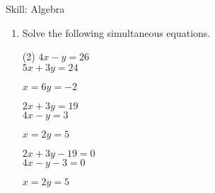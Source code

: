 \begin{bxTip}[colbacktitle=green]{Skill: Algebra}

\begin{enumerate} [leftmargin=0cm] 

\item Solve the following simultaneous equations.
\begin{tasks}[label=(\alph*), after-item-skip=2pt,after-skip=3pt, label-width=4ex](2)
    \task  $4x-y = 26$\\
           $5x + 3y = 24$	
	              \begin{envAnswer}[blankline=6]         $      x=6  y=-2        $ \end{envAnswer}


    \task  $2x + 3y = 19$\\
           $4x-y = 3$	
	              \begin{envAnswer}[blankline=6]         $      x=2  y=5       $ \end{envAnswer}


    \task  $2x + 3y - 19 = 0$\\
           $4x-y - 3   =0$	
	              \begin{envAnswer}[blankline=6]         $      x=2  y=5       $ \end{envAnswer}

\end{tasks}


\end{enumerate}

\end{bxTip}




\clearpage

